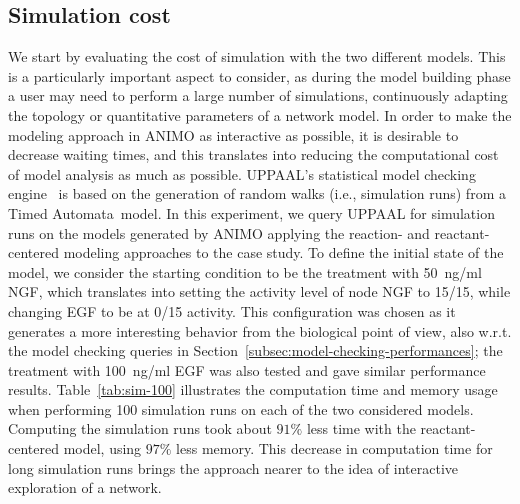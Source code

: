 \documentclass{llncs}
\newcommand{\tas}{Timed Automata}
\begin{document}
\subsection{Simulation cost}
We start by evaluating the cost of simulation with the two different models. This is a particularly
important aspect to consider, as during the model building phase a user may need to perform a large number of simulations,
continuously adapting the topology or quantitative parameters of a network model. In order to make
the modeling approach in ANIMO as interactive as possible, it is desirable to decrease waiting times,
and this translates into reducing the computational cost of model analysis as much as possible.
UPPAAL's statistical model checking engine~\cite{uppaal-smc} is based on the generation of random walks (i.e., simulation runs) from a \tas\ model.
In this experiment, we query UPPAAL for simulation runs on the models
generated by ANIMO applying the reaction- and reactant-centered modeling approaches to the case study.
To define the initial state of the model, we consider the starting condition to be the treatment with 50~ng/ml NGF, which translates into
setting the activity level of node NGF to 15/15, while changing EGF to be at 0/15 activity.
This configuration was chosen as it generates a more interesting behavior from the biological point of view,
also w.r.t. the model checking queries in Section~\ref{subsec:model-checking-performances};
the treatment with 100~ng/ml EGF was also tested and gave similar performance results.
Table~\ref{tab:sim-100} illustrates the computation time and memory usage when performing 100 simulation runs on each of the
two considered models. Computing the simulation runs took about $91 \%$ less time with the reactant-centered model, using $97 \%$
less memory. This decrease in computation time for long simulation runs brings the approach nearer to the idea
of interactive exploration of a network.
\end{document}
